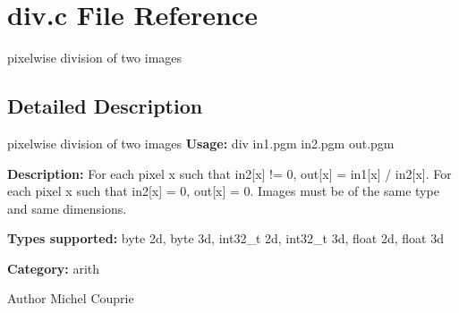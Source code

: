 \section{div.c File Reference}
\label{div_8c}


pixelwise division of two images  




\subsection{Detailed Description}
pixelwise division of two images {\bfseries Usage:} div in1.pgm in2.pgm out.pgm

{\bfseries Description:} For each pixel x such that in2[x] != 0, out[x] = in1[x] / in2[x]. For each pixel x such that in2[x] = 0, out[x] = 0. Images must be of the same type and same dimensions.

{\bfseries Types supported:} byte 2d, byte 3d, int32\_\-t 2d, int32\_\-t 3d, float 2d, float 3d

{\bfseries Category:} arith

\begin{DoxyAuthor}{Author}
Michel Couprie 
\end{DoxyAuthor}
